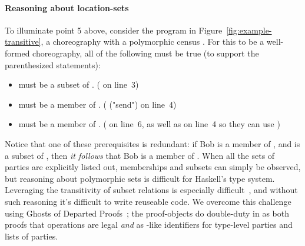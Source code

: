 
\paragraph{Reasoning about location-sets}
To illuminate point 5 above, consider the program in Figure~\ref{fig:example-transitive},
a choreography with a polymorphic census .
For this to be a well-formed choreography, all of the following must be true
(to support the parenthesized statements):
\begin{itemize}
    \item {} must be a subset of .
          ( on line~3)
    \item {} must be a member of .
          (\inlinecode{~>} ("send") on line~4)
    \item {} must be a member of .
          (\inlinecode{~>} on line~6, as well as \inlinecode{~>} on line~4 so they can use )
\end{itemize}
Notice that one of these prerequisites is redundant:
if Bob is a member of , and  is a subset of ,
then \emph{it follows} that Bob is a member of .
When all the sets of parties are explicitly listed out, memberships and subsets can simply be observed,
but reasoning about polymorphic sets is difficult for Haskell's type system.
Leveraging the transitivity of subset relations is especially difficult~\cite{stackoverflow2021},
and without such reasoning it's difficult to write reuseable code.
We overcome this challenge using Ghosts of Departed Proofs~\cite{noonanGDP};
the proof-objects do double-duty in \MultiChor as both proofs that operations are legal \emph{and}
as -like identifiers for type-level parties and lists of parties.


